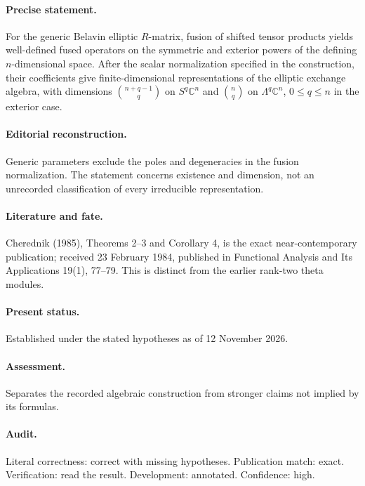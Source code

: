 \paragraph{Precise statement.} For the generic Belavin elliptic \(R\)-matrix, fusion of shifted tensor products yields well-defined fused operators on the symmetric and exterior powers of the defining \(n\)-dimensional space. After the scalar normalization specified in the construction, their coefficients give finite-dimensional representations of the elliptic exchange algebra, with dimensions \(\binom{n+q-1}{q}\) on \(S^q\mathbb C^n\) and \(\binom nq\) on \(\Lambda^q\mathbb C^n\), \(0\le q\le n\) in the exterior case.

\paragraph{Editorial reconstruction.} Generic parameters exclude the poles and degeneracies in the fusion normalization. The statement concerns existence and dimension, not an unrecorded classification of every irreducible representation.

\paragraph{Literature and fate.} Cherednik (1985), Theorems 2–3 and Corollary 4, is the exact near-contemporary publication; received 23 February 1984, published in Functional Analysis and Its Applications 19(1), 77–79. This is distinct from the earlier rank-two theta modules.

\paragraph{Present status.} Established under the stated hypotheses as of 12 November 2026.

\paragraph{Assessment.} Separates the recorded algebraic construction from stronger claims not implied by its formulas.

\paragraph{Audit.} Literal correctness: correct with missing hypotheses. Publication match: exact. Verification: read the result. Development: annotated. Confidence: high.

